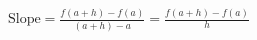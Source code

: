 \documentclass[preview]{standalone}
\begin{document}
\begin{align*}
\text{Slope} = \frac{f(a+h) - f(a)}{(a+h) - a} = \frac{f(a+h) - f(a)}{h}
\end{align*}
\end{document}
